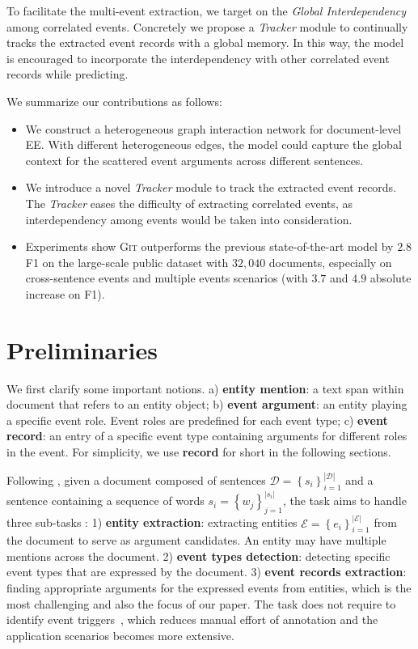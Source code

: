 \documentclass[11pt,a4paper]{article}
\newcommand{\modelname}{\textsc{Git}\xspace}
\begin{document}
To facilitate the multi-event extraction, we target on the \emph{Global Interdependency} among correlated events.
Concretely we propose a \textit{Tracker} module to continually tracks the extracted event records with a global memory. 
In this way, the model is encouraged to incorporate the interdependency with other correlated event records while predicting.


We summarize our contributions as follows:
\begin{itemize}
    \item We construct a heterogeneous graph interaction network for document-level EE. 
    With different heterogeneous edges,
    the model could capture the global context for the scattered event arguments across different sentences.
    \item We introduce a novel \textit{Tracker} module to track the extracted event records. The \textit{Tracker} eases the difficulty of extracting correlated events, as interdependency among events would be taken into consideration.
    \item Experiments show \modelname outperforms the previous state-of-the-art model by $2.8$ F1 on the large-scale public dataset \citep{zheng-etal-2019-doc2edag} with $32,040$ documents, especially on cross-sentence events and multiple events scenarios (with $3.7$ and $4.9$ absolute increase on F1).
\end{itemize}

 \section{Preliminaries}
We first clarify some important notions. 
a) \textbf{entity mention}: a text span within document that refers to an entity object; 
b) \textbf{event argument}: an entity playing a specific event role. Event roles are predefined for each event type;
c) \textbf{event record}: an entry of a specific event type containing arguments for different roles in the event. For simplicity, we use \textbf{record} for short in the following sections.


Following \citet{zheng-etal-2019-doc2edag}, given a document composed of sentences $\mathcal{D}=\left\{s_i\right\}^{\left| \mathcal{D} \right |}_{i=1}$ and a sentence containing a sequence of words $s_i=\left\{w_j\right\}^{\left | s_i \right |}_{j=1}$, the task aims to handle three sub-tasks : 
1) \textbf{entity extraction}: extracting entities $\mathcal{E}=\left\{e_i\right\}^{\left | \mathcal{E} \right |}_{i=1}$ from the document to serve as argument candidates. 
An entity may have multiple mentions across the document.
2) \textbf{event types detection}: detecting specific event types that are expressed by the document.
3) \textbf{event records extraction}: finding appropriate arguments for the expressed events from entities, which is the most challenging and also the focus of our paper.
The task does not require to identify event triggers~\citep{DBLP:conf/aaai/ZengFMWYSZ18, liu-etal-2019-event}, which reduces manual effort of annotation and the application scenarios becomes more extensive.
\end{document}

